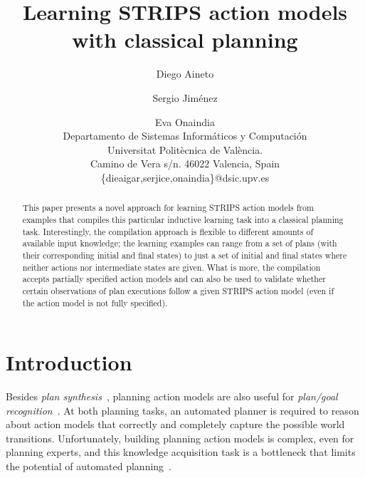 \documentclass[letterpaper]{article} %
\begin{document}
\title{Learning STRIPS action models with classical planning}

\author{Diego Aineto\and Sergio Jim\'enez\and Eva Onaindia\\
{\small Departamento de Sistemas Inform\'aticos y Computaci\'on}\\
{\small Universitat Polit\`ecnica de Val\`encia.}\\
{\small Camino de Vera s/n. 46022 Valencia, Spain}\\
{\small \{dieaigar,serjice,onaindia\}@dsic.upv.es}}

\maketitle
\begin{abstract}
This paper presents a novel approach for learning STRIPS action models from examples that compiles this particular inductive learning task into a classical planning task. Interestingly, the compilation approach is flexible to different amounts of available input knowledge; the learning examples can range from a set of plans (with their corresponding initial and final states) to just a set of initial and final states where neither actions nor intermediate states are given. What is more, the compilation accepts partially specified action models and can also be used to validate whether certain observations of plan executions follow a given STRIPS action model (even if the action model is not fully specified).
\end{abstract}


\section{Introduction}
Besides {\em plan synthesis}~\cite{ghallab2004automated,geffner:book:2013}, planning action models are also useful for {\em plan/goal recognition}~\cite{ramirez2012plan}. At both planning tasks, an automated planner is required to reason about action models that correctly and completely capture the possible world transitions. Unfortunately, building planning action models is complex, even for planning experts, and this knowledge acquisition task is a bottleneck that limits the potential of automated planning~\cite{kambhampati:modellite:AAAI2007}.
\end{document}
